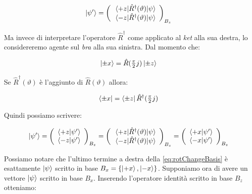 	\begin{equation}
		\ket{\psi'} =
			\left ( \begin{array}{c}
				\mel{+z}{\hat{R}^\dagger(\vartheta)}{\psi} \\
				\mel{-z}{\hat{R}^\dagger(\vartheta)}{\psi}
			\end{array} \right )_{B_z}
	\end{equation}

Ma invece di interpretare l'operatore $\hat{R}^\dagger$ come applicato al \textit{ket} alla sua destra, lo considereremo agente sul \textit{bra} alla sua sinistra. Dal momento che:

	\begin{equation}
		\ket{\pm x} = \hat{R} ( \tfrac{\pi}{2} j ) \ket{\pm z}
	\end{equation}

Se $\hat{R}^\dagger(\vartheta)$ \`e l'aggiunto di $\hat{R} ( \vartheta )$ allora:
	
	\begin{equation}
		\bra{\pm x} = \bra{\pm z} \hat{R}^\dagger ( \tfrac{\pi}{2} j )
	\end{equation}

Quindi possiamo scrivere:

	\begin{equation} \label{eq:rotChangeBasis}
		\ket{\psi'} =
			\left ( \begin{array}{c}
				\braket{+z}{\psi'} \\
				\braket{-z}{\psi'} \\
			\end{array} \right )_{B_z} =
			\left ( \begin{array}{c}
				\mel{+z}{\hat{R}^\dagger(\vartheta)}{\psi} \\
				\mel{-z}{\hat{R}^\dagger(\vartheta)}{\psi}
			\end{array} \right )_{B_z} =
			\left ( \begin{array}{c}
				\braket{+x}{\psi'} \\
				\braket{-x}{\psi'} \\
			\end{array} \right )_{B_z}
	\end{equation}

Possiamo notare che l'ultimo termine a destra della \eqref{eq:rotChangeBasis} \`e esattamente $\ket{\psi}$ scritto in base $B_x = \{ \ket{+x}, \ket{-x} \}$. Supponiamo ora di avere un vettore $\ket{\psi}$ scritto in base $B_x$. Inserendo l'operatore identit\`a scritto in base $B_z$ otteniamo:

